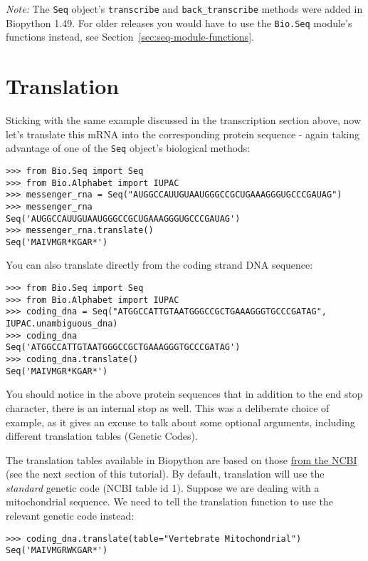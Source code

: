 \emph{Note:} The \verb|Seq| object's \verb|transcribe| and \verb|back_transcribe| methods
were added in Biopython 1.49.  For older releases you would have to use the \verb|Bio.Seq|
module's functions instead, see Section~\ref{sec:seq-module-functions}.

\section{Translation}
\label{sec:translation}
Sticking with the same example discussed in the transcription section above,
now let's translate this mRNA into the corresponding protein sequence - again taking
advantage of one of the \verb|Seq| object's biological methods:

\begin{verbatim}
>>> from Bio.Seq import Seq
>>> from Bio.Alphabet import IUPAC
>>> messenger_rna = Seq("AUGGCCAUUGUAAUGGGCCGCUGAAAGGGUGCCCGAUAG")
>>> messenger_rna
Seq('AUGGCCAUUGUAAUGGGCCGCUGAAAGGGUGCCCGAUAG')
>>> messenger_rna.translate()
Seq('MAIVMGR*KGAR*')
\end{verbatim}

You can also translate directly from the coding strand DNA sequence:

\begin{verbatim}
>>> from Bio.Seq import Seq
>>> from Bio.Alphabet import IUPAC
>>> coding_dna = Seq("ATGGCCATTGTAATGGGCCGCTGAAAGGGTGCCCGATAG", IUPAC.unambiguous_dna)
>>> coding_dna
Seq('ATGGCCATTGTAATGGGCCGCTGAAAGGGTGCCCGATAG')
>>> coding_dna.translate()
Seq('MAIVMGR*KGAR*')
\end{verbatim}

You should notice in the above protein sequences that in addition to the end stop character, there is an internal stop as well.  This was a deliberate choice of example, as it gives an excuse to talk about some optional arguments, including different translation tables (Genetic Codes).

The translation tables available in Biopython are based on those \href{https://www.ncbi.nlm.nih.gov/Taxonomy/Utils/wprintgc.cgi}{from the NCBI} (see the next section of this tutorial).  By default, translation will use the \emph{standard} genetic code (NCBI table id 1).
Suppose we are dealing with a mitochondrial sequence.  We need to tell the translation function to use the relevant genetic code instead:

\begin{verbatim}
>>> coding_dna.translate(table="Vertebrate Mitochondrial")
Seq('MAIVMGRWKGAR*')
\end{verbatim}

